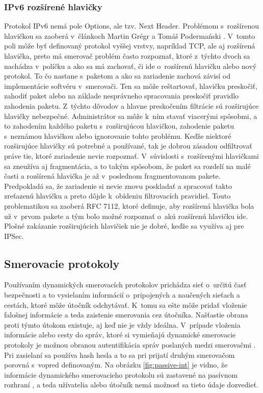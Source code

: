 \subsubsection{IPv6 rozšírené hlavičky}
Protokol IPv6 nemá pole Options, ale tzv. Next Header. Problémom s~rozšírenou hlavičkou sa zaoberá v~článkoch Martin Grégr a Tomáš Podermański \cite{Gregr2622015} \cite{Podermanski1922015}. V~tomto poli môže byť definovaný protokol vyššej vrstvy, napríklad TCP, ale aj rozšírená hlavička, preto má smerovač problém často rozpoznať, ktoré z~týchto dvoch sa nachádza v~políčku a ako sa má zachovať, či ide o~rozšírenú hlavičku alebo nový protokol. To čo nastane s~paketom a ako sa zariadenie zachová závisí od implementácie softvéru v~smerovači. Ten sa môže reštartovať, hlavičku preskočiť, zahodiť paket alebo na základe nesprávneho spracovania preskočiť pravidlo zahodenia paketu. Z~týchto dôvodov a hlavne preskočením filtrácie sú rozširujúce hlavičky nebezpečné. Administrátor sa môže k~ním stavať viacerými spôsobmi, a to zahodením každého paketu s~rozširujúcou hlavičkou, zahodenie paketu s~neznámou hlavičkou alebo ignorovanie tohto problému. Keďže niektoré rozširujúce hlavičky sú potrebné a používané, tak je dobrou zásadou odfiltrovať práve tie, ktoré zariadenie nevie rozpoznať. V~súvislosti s~rozšírenými hlavičkami sa zneužíva aj fragmentácia, a to takým spôsobom, že paket sa rozdelí na malé časti a rozšírená hlavička je až v~poslednom fragmentovanom pakete. Predpokladá sa, že zariadenie si nevie znovu poskladať a spracovať takto zreťazenú hlavičku a preto dôjde k~obídeniu filtrovacích pravidiel. Touto problematikou sa zaoberá RFC 7112, ktoré definuje, aby rozšírená hlavička bola už v~prvom pakete a tým bolo možné rozpoznať o~akú rozšírenú hlavičku ide. Plošné zakázanie rozširujúcich hlavičiek nie je dobré, keďže sa využíva aj pre IPSec.

\subsection{Smerovacie protokoly}
Používaním dynamických smerovacích protokolov prichádza sieť o~určitú časť bezpečnosti a to vysielaním informácií o~pripojených a naučených sieťach a cestách, ktoré môže útočník odchytávať. K~tomu sa ešte môže pridať vloženie falošnej informácie a teda zaistenie smerovania cez útočníka. Našťastie obrana proti týmto útokom existuje, aj keď nie je vždy ideálna. V~prípade vloženia informácie alebo cesty do správ, ktoré si vymieňajú dynamické smerovacie protokoly je možnou obranou autentifikácia správ poslaných medzi smerovačmi \cite{McMillan2018} \cite{Singh2018} \cite{CIS_DrTLsgXv24lxeIIM}. Pri zasielaní sa používa hash hesla a to sa pri prijatí druhým smerovačom porovná s~vopred definovaným. Na obrázku \ref{fig:passive-int} je vidno, že informácie dynamického smerovacieho protokolu sú zastavené na pasívnom rozhraní \cite{Khandelwal2016}, a teda užívatelia alebo útočník nemá možnosť sa tieto údaje dozvedieť.

